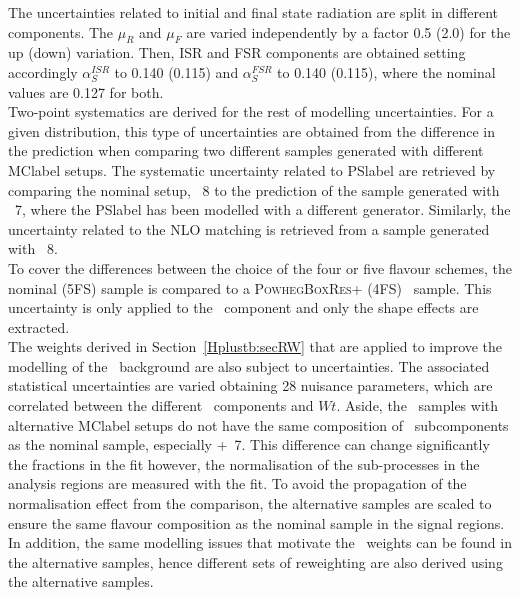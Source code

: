 The uncertainties related to initial and final state radiation are split in different components. The $\mu_R$ and $\mu_F$ are varied independently by a factor 0.5 (2.0) for the up (down) variation. Then, ISR and FSR components are obtained setting accordingly $\alpha_S^{ISR}$ to 0.140 (0.115) and $\alpha_S^{FSR}$ to 0.140 (0.115), where the nominal values are 0.127 for both.\\

Two-point systematics are derived for the rest of modelling uncertainties. For a given distribution, this type of uncertainties are obtained from the difference in the prediction when comparing two different samples generated with different \acrshort{MClabel} setups. The systematic uncertainty related to \acrshort{PSlabel} are retrieved by comparing the nominal setup, \POWHEGPYTHIA~8 to the prediction of the sample generated with \POWHEGHERWIG~7, where the \acrshort{PSlabel} has been modelled with a different generator. Similarly, the uncertainty related to the NLO matching is retrieved from a sample generated with \MGMCatNLOPYTHIA~8.\\

To cover the differences between the choice of the four or five flavour schemes, the nominal (5FS) sample is compared to a \textsc{PowhegBoxRes}+ (4FS) \ttb\ sample. This uncertainty is only applied to the \ttb\ component and only the shape effects are extracted.\\

The weights derived in Section~\ref{Hplustb:secRW} that are applied to improve the modelling of the \ttbar\ background are also subject to uncertainties. The associated statistical uncertainties are varied obtaining 28 nuisance parameters, which are correlated between the different \ttbar\ components and $Wt$. Aside, the \ttbar\ samples with alternative \acrshort{MClabel} setups do not have the same composition of \ttbar\ subcomponents as the nominal sample, especially \POWHEGBOX+\HERWIG~7. This difference can change significantly the fractions in the fit however, the normalisation of the sub-processes in the analysis regions are measured with the fit. To avoid the propagation of the normalisation effect from the comparison, the alternative samples are scaled to ensure the same flavour composition as the nominal sample in the signal regions. In addition, the same modelling issues that motivate the \ttbar\ weights can be found in the alternative samples, hence different sets of reweighting are also derived using the alternative samples.\\

